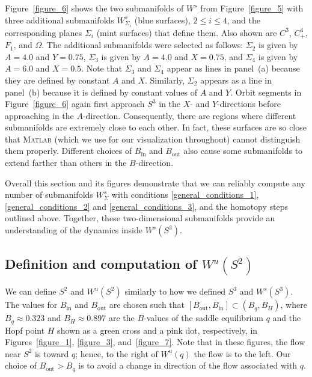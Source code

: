 \documentclass{ws-ijbc}
\begin{document}
Figure~\ref{figure_6} shows the two submanifolds of $W^{s}$ from Figure~\ref{figure_5} with three additional submanifolds $W^s_{\Sigma_i}$ (blue surfaces), $2 \leq i \leq 4$, and the corresponding planes $\Sigma_i$ (mint surfaces) that define them.  Also shown are $C^3$, $C^4_+$, $F_1$, and $\Omega$.  The additional submanifolds were selected as follows: $\Sigma_2$ is given by $A=4.0$ and $Y=0.75$, $\Sigma_3$ is given by $A=4.0$ and $X=0.75$, and $\Sigma_4$ is given by $A=6.0$ and $X=0.5$.  Note that  $\Sigma_3$ and $\Sigma_4$ appear as lines in panel~(a) because they are defined by constant $A$ and $X$.  Similarly, $\Sigma_2$ appears as a line in panel~(b) because it is defined by constant values of $A$ and $Y$.  Orbit segments in Figure~\ref{figure_6} again first approach $S^3$ in the $X$- and $Y$-directions before approaching in the $A$-direction.  Consequently, there are regions where different submanifolds are extremely close to each other.  In fact, these surfaces are so close that \textsc{Matlab} (which we use for our visualization throughout) cannot distinguish them properly.  Different choices of $B_{\text{in}}$ and $B_{\text{out}}$ also cause some submanifolds to extend farther than others in the $B$-direction.

Overall this section and its figures demonstrate that we can reliably compute any number of submanifolds $W^s_\Sigma$ with conditions \eqref{general_conditions_1},  \eqref{general_conditions_2} and \eqref{general_conditions_3}, and the homotopy steps outlined above.  Together, these two-dimensional submanifolds provide an understanding of the dynamics inside $W^s(S^3)$.


\subsection{Definition and computation of $W^{u}(S^2)$}  
\label{sec:compWuS2}

We can define $S^2$ and $W^u(S^2)$ similarly to how we defined $S^3$ and $W^s(S^3)$.  The values for $B_{\text{in}}$ and $B_{\text{out}}$ are chosen such that $[B_{\text{out}}, B_{\text{in}}] \subset (B_q, B_H)$, where $B_q \approx 0.323$ and $B_H \approx 0.897$ are the $B$-values of the saddle equilibrium $q$ and the Hopf point $H$ shown as a green cross and a pink dot, respectively, in Figures~\ref{figure_1}, \ref{figure_3}, and~\ref{figure_7}. Note that in these figures, the flow near $S^2$ is toward $q$; hence, to the right of $W^u(q)$ the flow is to the left.  Our choice of $B_{\text{out}}>B_{q}$ is to avoid a change in direction of the flow associated with $q$.
\end{document}
